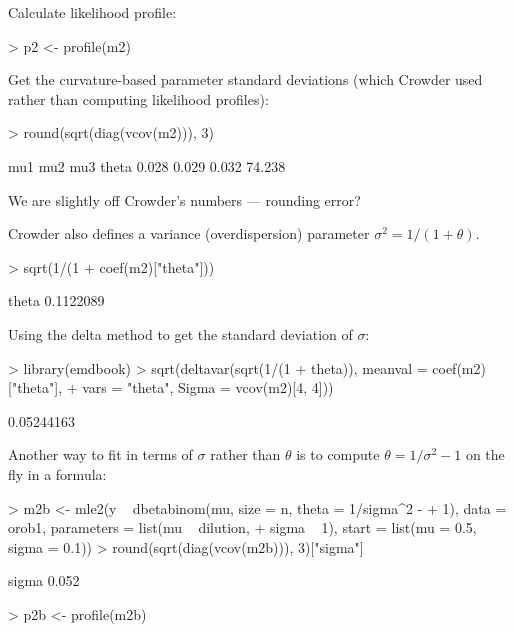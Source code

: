 \documentclass{article}
\begin{document}
Calculate likelihood profile:
\begin{Schunk}
\begin{Sinput}
> p2 <- profile(m2)
\end{Sinput}
\end{Schunk}

Get the curvature-based parameter standard
deviations (which Crowder used
rather than computing likelihood profiles):
\begin{Schunk}
\begin{Sinput}
> round(sqrt(diag(vcov(m2))), 3)
\end{Sinput}
\begin{Soutput}
   mu1    mu2    mu3  theta 
 0.028  0.029  0.032 74.238 
\end{Soutput}
\end{Schunk}
We are slightly off Crowder's numbers --- rounding
error?

Crowder also defines a variance (overdispersion) parameter
$\sigma^2=1/(1+\theta)$.
\begin{Schunk}
\begin{Sinput}
> sqrt(1/(1 + coef(m2)["theta"]))
\end{Sinput}
\begin{Soutput}
    theta 
0.1122089 
\end{Soutput}
\end{Schunk}

Using the delta method to get the standard deviation of
$\sigma$:
\begin{Schunk}
\begin{Sinput}
> library(emdbook)
> sqrt(deltavar(sqrt(1/(1 + theta)), meanval = coef(m2)["theta"], 
+     vars = "theta", Sigma = vcov(m2)[4, 4]))
\end{Sinput}
\begin{Soutput}
[1] 0.05244163
\end{Soutput}
\end{Schunk}

Another way to fit in terms of $\sigma$ rather than $\theta$
is to compute $\theta=1/\sigma^2-1$ on the fly in a
formula:

\begin{Schunk}
\begin{Sinput}
> m2b <- mle2(y ~ dbetabinom(mu, size = n, theta = 1/sigma^2 - 
+     1), data = orob1, parameters = list(mu ~ dilution, 
+     sigma ~ 1), start = list(mu = 0.5, sigma = 0.1))
> round(sqrt(diag(vcov(m2b))), 3)["sigma"]
\end{Sinput}
\begin{Soutput}
sigma 
0.052 
\end{Soutput}
\begin{Sinput}
> p2b <- profile(m2b)
\end{Sinput}
\end{Schunk}
\end{document}
